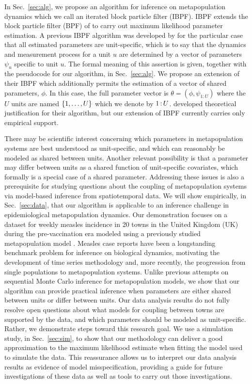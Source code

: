 \documentclass[12pt]{article}\usepackage[]{graphicx}\usepackage[]{xcolor}
\begin{document}
In Sec.~\ref{sec:alg}, we propose an algorithm for inference on metapopulation dynamics which we call an iterated block particle filter (IBPF).
IBPF extends the block particle filter (BPF) of \citet{rebeschini15} to carry out maximum likelihood parameter estimation.
A previous IBPF algorithm was developed by \citet{ning21-ibpf} for the particular case that all estimated parameters are unit-specific, which is to say that the dynamics and measurement process for a unit $u$ are determined by a vector of parameters $\psi_u$ specific to unit $u$.
The formal meaning of this assertion is given, together with the pseudocode for our algorithm, in Sec.~\ref{sec:alg}.
We propose an extension of their IBPF which additionally permits the estimation of a vector of shared parameters, $\phi$.
In this case, the full parameter vector is $\theta=(\phi,\psi_{1:U})$ where the $U$ units are named $\{1,\dots,U\}$ which we denote by ${1}{\hspace{0.6mm}:\hspace{0.6mm}}{U}$.
\citet{ning21-ibpf} developed theoretical justification for their algorithm, but our extension of IBPF currently carries only empirical support.

There may be scientific interest concerning which parameters in metapopulation systems are best understood as unit-specific, and which can reasonably be modeled as shared between units.
Another relevant possibility is that a parameter may differ between units as a shared function of unit-specific covariates, which formally is a special case of a shared parameter.
Addressing these issues is also a prerequisite for studying questions about the coupling of metapopulation systems via model-based inference from spatiotemporal data.
We will show empirically, in Sec.~\ref{sec:data}, that our {\ibpf} algorithm is applicable to an inference challenge in epidemiological metapopulation dynamics.
Our demonstration focuses on a dataset for weekly measles incidence in 20 towns in the United Kingdom (UK) during the pre-vaccination era \citep{he10} modeled using a previously studied metapopulation model \citep{park20,ionides21}.
Measles case reports have been a longstanding benchmark problem for inference on biological dynamics, motivating the development of time series methodology and, more recently, the progression from single populations to metapopulation systems.
Unlike previous attempts on sequential Monte Carlo inference for metapopulation models, we show that our algorithm can provide practical inference when parameters are either shared between units or differ between units.
Our data analysis results do not fully resolve open questions about what models for coupling between towns are supported by the data, and which parameters should be modeled as unit-specific.
Rather, we demonstrate steps toward this research goal.
We use a simulation study, in Sec.~\ref{sec:sim}, to show that our methodology can deliver a good approximation to the maximum likelihood estimate when fitting the model used to simulate the data.
This reassurance allows us to interpret our data analysis results as evidence of model misspecification, providing a guide for future investigations of these data as well as tools to carry out those investigations.
\end{document}
